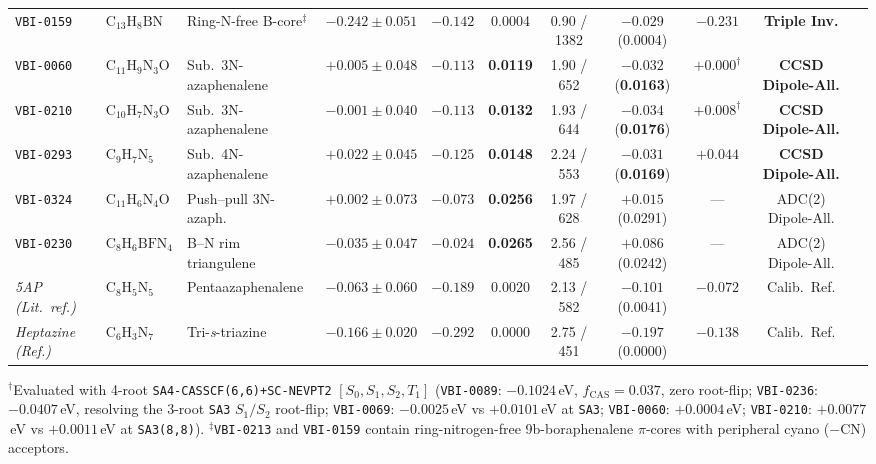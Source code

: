 \documentclass[10pt,twocolumn]{article}
\theoremstyle{natthm}
\begin{document}
\begin{table}[t!]
{\begin{tabular}{@{}lllcccccccc@{}}
\texttt{VBI-0159} & $\mathrm{C}_{13}\mathrm{H}_8\mathrm{BN}$ & Ring-N-free B-core$^\ddagger$ & $-0.242\pm 0.051$ & $\mathbf{-0.142}$ & 0.0004 & 0.90 / 1382 & $\mathbf{-0.029}$ (0.0004) & $\mathbf{-0.231}$ & \textbf{Triple Inv.} \\
\texttt{VBI-0060} & $\mathrm{C}_{11}\mathrm{H}_9\mathrm{N}_3\mathrm{O}$ & Sub.\ 3N-azaphenalene & $+0.005\pm 0.048$ & $\mathbf{-0.113}$ & \textbf{0.0119} & 1.90 / 652 & $\mathbf{-0.032}$ (\textbf{0.0163}) & $+0.000^\dagger$ & \textbf{CCSD Dipole-All.} \\
\texttt{VBI-0210} & $\mathrm{C}_{10}\mathrm{H}_7\mathrm{N}_3\mathrm{O}$ & Sub.\ 3N-azaphenalene & $-0.001\pm 0.040$ & $\mathbf{-0.113}$ & \textbf{0.0132} & 1.93 / 644 & $\mathbf{-0.034}$ (\textbf{0.0176}) & $+0.008^\dagger$ & \textbf{CCSD Dipole-All.} \\
\texttt{VBI-0293} & $\mathrm{C}_{9}\mathrm{H}_7\mathrm{N}_5$ & Sub.\ 4N-azaphenalene & $+0.022\pm 0.045$ & $\mathbf{-0.125}$ & \textbf{0.0148} & 2.24 / 553 & $\mathbf{-0.031}$ (\textbf{0.0169}) & $+0.044$ & \textbf{CCSD Dipole-All.} \\
\texttt{VBI-0324} & $\mathrm{C}_{11}\mathrm{H}_6\mathrm{N}_4\mathrm{O}$ & Push--pull 3N-azaph. & $+0.002\pm 0.073$ & $\mathbf{-0.073}$ & \textbf{0.0256} & 1.97 / 628 & $+0.015$ (0.0291) & --- & ADC(2) Dipole-All. \\
\texttt{VBI-0230} & $\mathrm{C}_{8}\mathrm{H}_6\mathrm{BFN}_4$ & B--N rim triangulene & $-0.035\pm 0.047$ & $\mathbf{-0.024}$ & \textbf{0.0265} & 2.56 / 485 & $+0.086$ (0.0242) & --- & ADC(2) Dipole-All. \\
\midrule
\textit{5AP (Lit.\ ref.\cite{wilson2024})} & $\mathrm{C}_{8}\mathrm{H}_5\mathrm{N}_5$ & Pentaazaphenalene & $-0.063\pm 0.060$ & $-0.189$ & 0.0020 & 2.13 / 582 & $-0.101$ (0.0041) & $-0.072$ & Calib.\ Ref. \\
\textit{Heptazine (Ref.)} & $\mathrm{C}_{6}\mathrm{H}_3\mathrm{N}_7$ & Tri-\emph{s}-triazine & $-0.166\pm 0.020$ & $-0.292$ & 0.0000 & 2.75 / 451 & $-0.197$ (0.0000) & $-0.138$ & Calib.\ Ref. \\
\bottomrule
\end{tabular}}
\par\vspace{2pt}
{\raggedright\sffamily\fontsize{6.5}{7.8}\selectfont
$^\dagger$Evaluated with 4-root \texttt{SA4-CASSCF(6,6)+SC-NEVPT2} $[S_0,S_1,S_2,T_1]$ (\texttt{VBI-0089}: $-0.1024$\,eV, $f_{\mathrm{CAS}}=0.037$, zero root-flip; \texttt{VBI-0236}: $-0.0407$\,eV, resolving the 3-root \texttt{SA3} $S_1/S_2$ root-flip; \texttt{VBI-0069}: $-0.0025$\,eV vs $+0.0101$\,eV at \texttt{SA3}; \texttt{VBI-0060}: $+0.0004$\,eV; \texttt{VBI-0210}: $+0.0077$\,eV vs $+0.0011$\,eV at \texttt{SA3(8,8)}).
$^\ddagger$\texttt{VBI-0213} and \texttt{VBI-0159} contain ring-nitrogen-free 9b-boraphenalene $\pi$-cores with peripheral cyano ($-\mathrm{CN}$) acceptors.\par}
\end{table}
\end{document}
